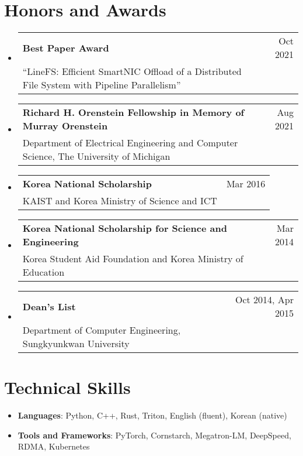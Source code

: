 \documentclass[letterpaper,oneside,11pt]{article}
\makeatletter
\newcommand{\resumeItem}[2]{
  \item\small{
    \textbf{#1}{: #2 \vspace{-3pt}}
  }
}
\newcommand{\resumeSubheading}[4]{
  \vspace{-1pt}\item
    \begin{tabularx}{0.97\textwidth}[t]{X@{\hspace{20pt}}r}
      \textbf{#1} & #2 \\
      \small#3 & \small #4 \\
    \end{tabularx}\vspace{-3pt}
}
\newcommand{\resumeSubHeadingListStart}{\begin{itemize}[leftmargin=*]}
\newcommand{\resumeSubHeadingListEnd}{\end{itemize}}
\makeatother
\begin{document}
\section{Honors and Awards}
  \resumeSubHeadingListStart
    \resumeSubheading{Best Paper Award}{Oct 2021}
    {``LineFS: Efficient SmartNIC Offload of a Distributed File System with Pipeline Parallelism''}{}
    \resumeSubheading{Richard H. Orenstein Fellowship in Memory of Murray Orenstein}{Aug 2021}
    {Department of Electrical Engineering and Computer Science, The University of Michigan}{}
    \resumeSubheading{Korea National Scholarship}{Mar 2016}
    {KAIST and Korea Ministry of Science and ICT}{}
    \resumeSubheading{Korea National Scholarship for Science and Engineering}
    {Mar 2014}
    {Korea Student Aid Foundation and Korea Ministry of Education}{}
    \resumeSubheading{Dean's List}{Oct 2014, Apr 2015}
    {Department of Computer Engineering, Sungkyunkwan University}{}
  \resumeSubHeadingListEnd

%
\section{Technical Skills}
 \resumeSubHeadingListStart
  \resumeItem{Languages}{Python, C++, Rust, Triton, English (fluent), Korean (native)}
  \resumeItem{Tools and Frameworks}{PyTorch, Cornstarch, Megatron-LM, DeepSpeed, RDMA, Kubernetes}
 \resumeSubHeadingListEnd

\end{document}
